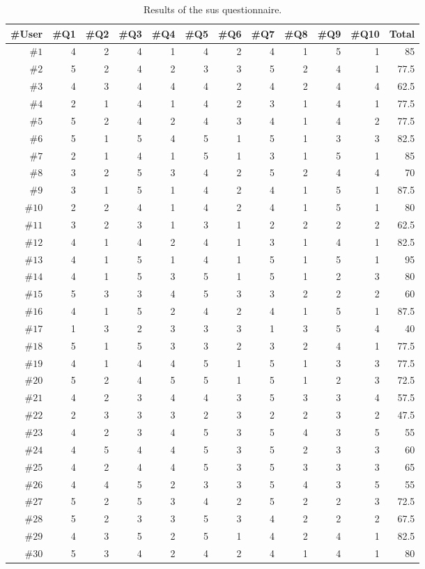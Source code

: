 \begin{table}
  \caption{Results of the \ac{sus} questionnaire.}
 \label{tbl:sus_questionnaire_results}
\footnotesize
\centering
 \begin{tabular}{r r r r r r r r r r r r}
  \hline 
  \textbf{\#User} &\textbf{\#Q1} & \textbf{\#Q2}& \textbf{\#Q3}& \textbf{\#Q4}& \textbf{\#Q5}& \textbf{\#Q6}& \textbf{\#Q7}& \textbf{\#Q8}& \textbf{\#Q9} & \textbf{\#Q10} & \textbf{Total}\\
  \hline
  $\#1$ & 4	& 2& 	4& 	1& 	4& 	2& 	4& 	1& 	5& 	1& 85	\\
  $\#2$ & 5&	2&	4&	2&	3&	3&	5&	2&	4&	1& 77.5	\\
  $\#3$ & 4&	3&	4&	4&	4&	2&	4&	2&	4&	4& 62.5	\\
  $\#4$ & 2&	1&	4&	1&	4&	2&	3&	1&	4&	1& 77.5	\\
  $\#5$ & 5&	2&	4&	2&	4&	3&	4&	1&	4&	2& 77.5	\\
  $\#6$ & 5&	1&	5&	4&	5&	1&	5&	1&	3&	3& 82.5	\\
  $\#7$ & 2&	1&	4&	1&	5&	1&	3&	1&	5&	1& 85	\\
  $\#8$ & 3&	2&	5&	3&	4&	2&	5&	2&	4&	4& 70	\\
  $\#9$ & 3&	1&	5&	1&	4&	2&	4&	1&	5&	1& 87.5	\\
  $\#10$ & 2&	2&	4&	1&	4&	2&	4&	1&	5&	1& 80	\\
  $\#11$ & 3&	2&	3&	1&	3&	1&	2&	2&	2&	2& 62.5	\\
  $\#12$ & 4&	1&	4&	2&	4&	1&	3&	1&	4&	1& 82.5	\\
  $\#13$ & 4&	1&	5&	1&	4&	1&	5&	1&	5&	1& 95	\\
  $\#14$ & 4&	1&	5&	3&	5&	1&	5&	1&	2&	3& 80	\\
  $\#15$ & 5&	3&	3&	4&	5&	3&	3&	2&	2&	2& 60	\\
  $\#16$ & 4&	1&	5&	2&	4&	2&	4&	1&	5&	1& 87.5	\\
  $\#17$ & 1&	3&	2&	3&	3&	3&	1&	3&	5&	4& 40	\\
  $\#18$ & 5&	1&	5&	3&	3&	2&	3&	2&	4&	1& 77.5	\\
  $\#19$ & 4&	1&	4&	4&	5&	1&	5&	1&	3&	3& 77.5	\\
  $\#20$ & 5&	2&	4&	5&	5&	1&	5&	1&	2&	3& 72.5	\\
  $\#21$ & 4&	2&	3&	4&	4&	3&	5&	3&	3&	4& 57.5	\\
  $\#22$ & 2&	3&	3&	3&	2&	3&	2&	2&	3&	2& 47.5	\\
  $\#23$ & 4&	2&	3&	4&	5&	3&	5&	4&	3&	5& 55	\\
  $\#24$ & 4&	5&	4&	4&	5&	3&	5&	2&	3&	3& 60	\\
  $\#25$ & 4&	2&	4&	4&	5&	3&	5&	3&	3&	3& 65	\\
  $\#26$ & 4&	4&	5&	2&	3&	3&	5&	4&	3&	5& 55	\\
  $\#27$ & 5&	2&	5&	3&	4&	2&	5&	2&	2&	3& 72.5	\\
  $\#28$ & 5&	2&	3&	3&	5&	3&	4&	2&	2&	2& 67.5	\\
  $\#29$ & 4&	3&	5&	2&	5&	1&	4&	2&	4&	1& 82.5	\\
  $\#30$ & 5&	3&	4&	2&	4&	2&	4&	1&	4&	1& 80	\\
  \hline
\end{tabular}
\end{table}